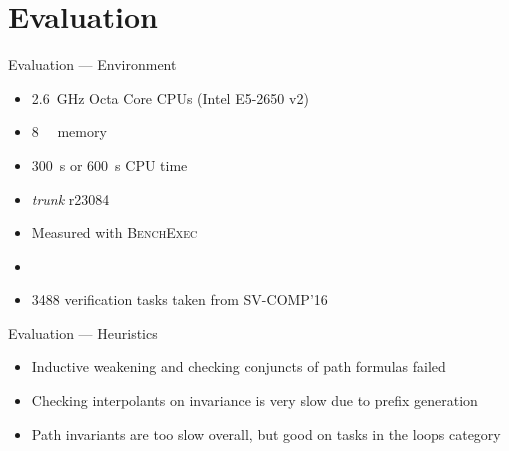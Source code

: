 \documentclass{beamer}
\begin{document}
\section{Evaluation}

\begin{frame}{Evaluation --- Environment}
 \begin{itemize}
  \item \SI{2.6}{\giga\hertz} Octa Core CPUs (Intel E5-2650 v2)
  \item \SI{8}{\giga\byte} memory
  \item \SI{300}{\second} or \SI{600}{\second} CPU time
  \item \emph{trunk} r23084
  \item Measured with {\smaller \textsc{BenchExec}}
  \item[]
  \item 3488 verification tasks taken from SV-COMP'16
 \end{itemize}
\end{frame}

\begin{frame}{Evaluation --- Heuristics}
 \begin{itemize}
  \item Inductive weakening and checking conjuncts of path formulas failed
  \item Checking interpolants on invariance is very slow due to prefix generation
  \item Path invariants are too slow overall, but good on tasks in the loops category
 \end{itemize}
\end{frame}
\end{document}
